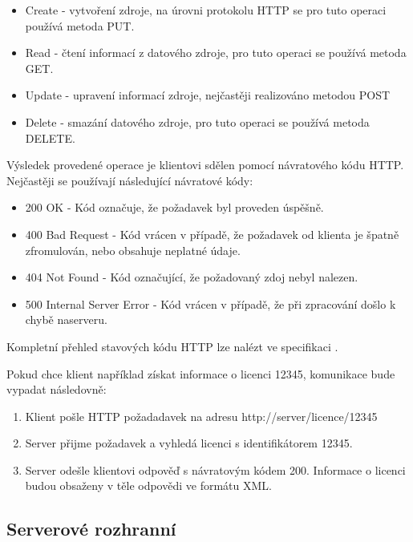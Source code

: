 \begin{itemize}
  \item Create - vytvoření zdroje, na úrovni protokolu \gls{HTTP} se pro tuto
  operaci používá metoda PUT.
  \item Read - čtení informací z datového zdroje, pro tuto operaci se používá
  metoda GET.
  \item Update - upravení informací zdroje, nejčastěji realizováno metodou POST
  \item Delete - smazání datového zdroje, pro tuto operaci se používá metoda
  DELETE.
\end{itemize}

Výsledek provedené operace je klientovi sdělen pomocí návratového kódu
\gls{HTTP}. Nejčastěji se používají následující návratové kódy:

\begin{itemize}
  \item 200 OK - Kód označuje, že požadavek byl proveden úspěšně.
  \item 400 Bad Request - Kód vrácen v případě, že požadavek od klienta je
  špatně zfromulován, nebo obsahuje neplatné údaje.
  \item 404 Not Found - Kód označující, že požadovaný zdoj nebyl nalezen.
  \item 500 Internal Server Error - Kód vrácen v případě, že při zpracování
  došlo k chybě naserveru.
\end{itemize}

Kompletní přehled stavových kódu \gls{HTTP} lze nalézt ve specifikaci
\cite{rfc-http}.

Pokud chce klient například získat informace o licenci 12345, komunikace bude
vypadat následovně:

\begin{enumerate}
  \item Klient pošle \gls{HTTP} požadadavek na adresu
  http://server/licence/12345
  \item Server přijme požadavek a vyhledá licenci s identifikátorem 12345.
  \item Server odešle klientovi odpověď s návratovým kódem 200. Informace o
  licenci budou obsaženy v těle odpovědi ve formátu \gls{XML}.
\end{enumerate}

\subsection{Serverové rozhranní}

